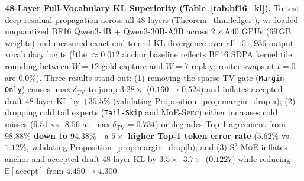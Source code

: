 \documentclass[10pt,twocolumn]{article}
\theoremstyle{definition}
\begin{document}
\noindent\textbf{48-Layer Full-Vocabulary KL Superiority (Table~\ref{tab:bf16_kl}).}
To test deep residual propagation across all $48$ layers (Theorem~\ref{thm:ledger}), we loaded unquantized BF16 Qwen3-4B + Qwen3-30B-A3B across $2\times\text{A40}$ GPUs ($69\,\text{GB}$ weights) and measured exact end-to-end KL divergence over all $151,936$ output vocabulary logits ($^\dagger$the $\approx\!0.012$ anchor baseline reflects BF16 SDPA kernel tile rounding between $W=12$ gold capture and $W=7$ replay; router swaps at $t=0$ are $0.0\%$). Three results stand out: (1) removing the sparse TV gate (\texttt{Margin-Only}) causes $\max \delta_{\mathrm{TV}}$ to jump $3.28\times$ ($0.160 \to 0.524$) and inflates accepted-draft 48-layer KL by $+35.5\%$ (validating Proposition~\ref{prop:margin_drop}a); (2) dropping cold tail experts (\texttt{Tail-Skip} and \textsc{MoE-Spec}) either increases cold misses ($9.51$ vs.\ $8.56$ at $\max \delta_{\mathrm{TV}}=0.734$) or degrades Top-1 agreement from \textbf{$98.88\%$ down to $94.38\%$}—a \textbf{$5\times$ higher Top-1 token error rate} ($5.62\%$ vs.\ $1.12\%$, validating Proposition~\ref{prop:margin_drop}b); and (3) \textsc{S$^2$-MoE} inflates anchor and accepted-draft 48-layer KL by \textbf{$3.5\times\text{--}3.7\times$} ($0.1227$) while reducing $\mathbb{E}[\text{accept}]$ from $4.450 \to 4.300$.
\end{document}
